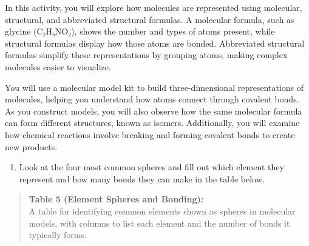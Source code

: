 \documentclass[
  letterpaper,
  DIV=11,
  numbers=noendperiod]{scrreprt}
\providecommand{\tightlist}{%
  \setlength{\itemsep}{0pt}\setlength{\parskip}{0pt}}
\begin{document}
In this activity, you will explore how molecules are represented using
molecular, structural, and abbreviated structural formulas. A molecular
formula, such as glycine (C₂H₅NO₂), shows the number and types of atoms
present, while structural formulas display how those atoms are bonded.
Abbreviated structural formulas simplify these representations by
grouping atoms, making complex molecules easier to visualize.

You will use a molecular model kit to build three-dimensional
representations of molecules, helping you understand how atoms connect
through covalent bonds. As you construct models, you will also observe
how the same molecular formula can form different structures, known as
isomers. Additionally, you will examine how chemical reactions involve
breaking and forming covalent bonds to create new products.

\begin{enumerate}
\def\labelenumi{\arabic{enumi}.}
\tightlist
\item
  Look at the four most common spheres and fill out which element they
  represent and how many bonds they can make in the table below.
\end{enumerate}

\begin{quote}
\textbf{Table 5 (Element Spheres and Bonding):}\\
A table for identifying common elements shown as spheres in molecular
models, with columns to list each element and the number of bonds it
typically forms.
\end{quote}
\end{document}

